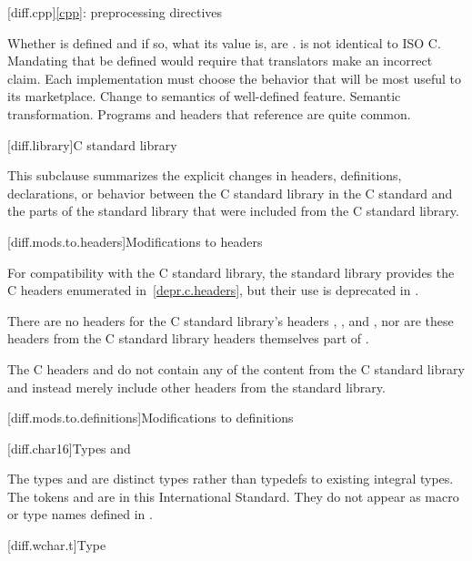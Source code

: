 [diff.cpp]{\ref{cpp}: preprocessing directives}

\change
Whether  is defined and if so, what its value is, are
.
\rationale
\Cpp{} is not identical to ISO C\@.
Mandating that 
be defined would require that translators make an incorrect claim.
Each implementation must choose the behavior that will be most
useful to its marketplace.
\effect
Change to semantics of well-defined feature.
\difficulty
Semantic transformation.
\howwide
Programs and headers that reference  are
quite common.

[diff.library]{C standard library}
%

\pnum
This subclause summarizes the explicit changes in headers,
definitions, declarations, or behavior between the C standard library
in the C standard and the parts of the \Cpp{} standard library that were
included from the C standard library.

[diff.mods.to.headers]{Modifications to headers}

\pnum
For compatibility with the C standard library,
the \Cpp{} standard library provides the C headers enumerated
in~\ref{depr.c.headers}, but their use is deprecated in \Cpp{}.

\pnum
There are no \Cpp{} headers for the C standard library's headers
,
,
and ,
nor are these headers from the C standard library headers themselves part of \Cpp{}.

\pnum
The C headers  and
 do not contain any of the content from
the C standard library and instead merely include other headers from the \Cpp{}
standard library.

[diff.mods.to.definitions]{Modifications to definitions}

[diff.char16]{Types  and }

\pnum
The types  and 
are distinct types rather than typedefs to existing integral types.
The tokens  and 
are  in this International Standard.
They do not appear as macro or type names defined in
.

[diff.wchar.t]{Type }

